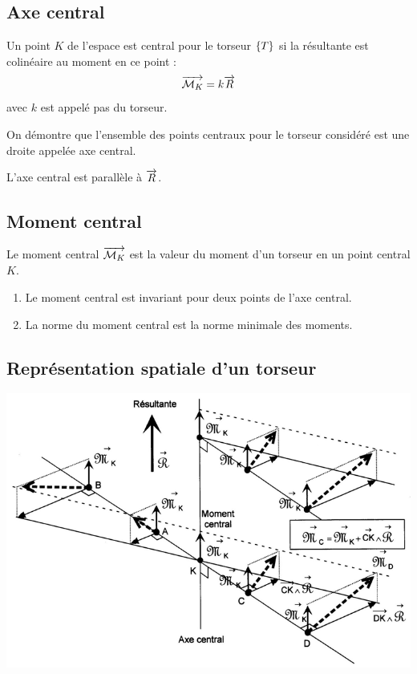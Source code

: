 \documentclass[10pt,oneside]{article}
\begin{document}
\subsection{Axe central}
Un point $K$ de l'espace est central pour le torseur $\left\{{T}\right\}$ si la résultante est colinéaire au moment en ce point :  
$$\overrightarrow{\mathcal{M}_K} =k \overrightarrow{R}$$
avec $k$ est appelé pas du torseur.

On démontre que l'ensemble des points centraux pour le torseur considéré est une droite appelée axe central. 

L'axe central est  parallèle à  $\overrightarrow{R}$.

\subsection{Moment central}
\begin{defi}
Le moment central $\overrightarrow{\mathcal{M}_K}$ est la valeur du moment d'un torseur en un point central $K$.
\end{defi}
\begin{props}
\begin{enumerate}
\item Le moment central est invariant pour deux points de l'axe central.
\item La norme du moment central est la norme minimale des moments. 
\end{enumerate}
\end{props}



\subsection{Représentation spatiale d'un torseur}

\begin{center}
\includegraphics[width=.7\textwidth]{png/fig_03}
\end{center}
\end{document}
